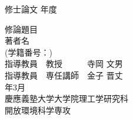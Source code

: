 \pagestyle{empty}

{\LARGE 修士論文} \hspace{\fill} {\LARGE 年度}
\begin{center}
  \vspace{5cm}
  {\huge 修論題目}\\
  \vspace{2cm}
  {\Huge 著者名}\\
  {\LARGE (学籍番号：)}\\
  \vspace{3cm}
  {\LARGE 指導教員　教授　　　寺岡 文男}\\
  {\LARGE 指導教員　専任講師　金子 晋丈}\\
  \vspace{2cm}
  {\Large 年3月}\\
  \vspace{1cm}
  {\LARGE 慶應義塾大学大学院理工学研究科}\\
  {\LARGE 開放環境科学専攻} \\
\end{center}

\clearpage
\newpage
